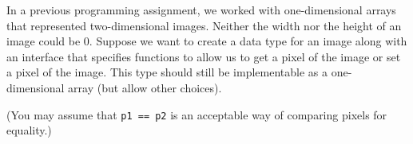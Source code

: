 \clearpage
\bgroup
\newcommand{\IMG}{IMG}%
\newcommand{\ROW}{row}
\newcommand{\COL}{col}
\newcommand{\PIXEL}{P}%
\newcommand{\WIDTH}{width}%
\newcommand{\HEIGHT}{height}%




In a previous programming assignment, we worked with one-dimensional
arrays that represented two-dimensional images.  Neither the width nor
the height of an image could be 0.  Suppose we want to create a data
type for an image along with an interface that specifies functions to
allow us to get a pixel of the image or set a pixel of the image.
This type should still be implementable as a one-dimensional array
(but allow other choices).

(You may assume that \lstinline'p1 == p2' is an acceptable way of
comparing pixels for equality.)

